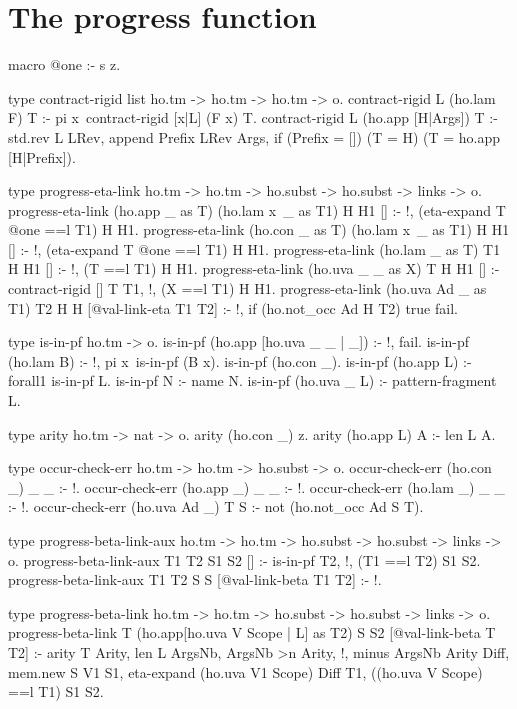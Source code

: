 \section{The progress function}

\begin{elpicode}
  
  macro @one :- s z.

  type contract-rigid list ho.tm -> ho.tm -> ho.tm -> o.
  contract-rigid L (ho.lam F) T :- 
    pi x\ contract-rigid [x|L] (F x) T. %
  contract-rigid L (ho.app [H|Args]) T :- 
    std.rev L LRev, append Prefix LRev Args,
    if (Prefix = []) (T = H) (T = ho.app [H|Prefix]).

  type progress-eta-link ho.tm -> ho.tm -> ho.subst -> ho.subst -> links -> o.
  progress-eta-link (ho.app _ as T) (ho.lam x\ _ as T1) H H1 [] :- !, 
    ({eta-expand T @one} ==l T1) H H1.
  progress-eta-link (ho.con _ as T) (ho.lam x\ _ as T1) H H1 [] :- !, 
    ({eta-expand T @one} ==l T1) H H1.
  progress-eta-link (ho.lam _ as T) T1 H H1 [] :- !, 
    (T ==l T1) H H1.
  progress-eta-link (ho.uva _ _ as X) T H H1 [] :- 
    contract-rigid [] T T1, !, (X ==l T1) H H1.
  progress-eta-link (ho.uva Ad _ as T1) T2 H H [@val-link-eta T1 T2] :- !, 
    if (ho.not_occ Ad H T2) true fail.

  type is-in-pf ho.tm -> o.
  is-in-pf (ho.app [ho.uva _ _ | _]) :- !, fail.
  is-in-pf (ho.lam B) :- !, pi x\ is-in-pf (B x).
  is-in-pf (ho.con _).
  is-in-pf (ho.app L) :- forall1 is-in-pf L.
  is-in-pf N :- name N.
  is-in-pf (ho.uva _ L) :- pattern-fragment L.

  type arity ho.tm -> nat -> o.
  arity (ho.con _) z.
  arity (ho.app L) A :- len L A.

  type occur-check-err ho.tm -> ho.tm -> ho.subst -> o.
  occur-check-err (ho.con _) _ _ :- !.
  occur-check-err (ho.app _) _ _ :- !.
  occur-check-err (ho.lam _) _ _ :- !.
  occur-check-err (ho.uva Ad _) T S :-
    not (ho.not_occ Ad S T).

  type progress-beta-link-aux ho.tm -> ho.tm -> 
          ho.subst -> ho.subst -> links -> o.
  progress-beta-link-aux T1 T2 S1 S2 [] :-  is-in-pf T2, !,
    (T1 ==l T2) S1 S2.
  progress-beta-link-aux T1 T2 S S [@val-link-beta T1 T2] :- !.

  type progress-beta-link ho.tm -> ho.tm -> ho.subst -> 
        ho.subst -> links -> o.
  progress-beta-link T (ho.app[ho.uva V Scope | L] as T2) S S2 [@val-link-beta T T2] :- 
    arity T Arity, len L ArgsNb, ArgsNb >n Arity, !,
    minus ArgsNb Arity Diff, mem.new S V1 S1,
    eta-expand (ho.uva V1 Scope) Diff T1,
    ((ho.uva V Scope) ==l T1) S1 S2.


\end{elpicode}
